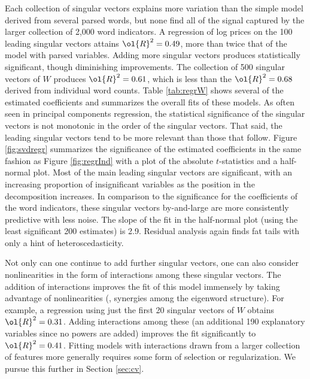 \documentclass[10pt]{article}
\begin{document}
Each collection of singular vectors explains more variation than the simple model derived from several parsed words, but none find all of the signal captured by the larger collection of 2,000 word indicators.  A regression of log prices on the 100 leading singular vectors attains $\ol{R}^2 = 0.49$, more than twice that of the model with parsed variables.  Adding more singular vectors produces statistically significant, though diminishing improvements.  The collection of 500 singular vectors of $W$ produces $\ol{R}^2 = 0.61$, which is less than the $\ol{R}^2 = 0.68$ derived from individual word counts.  Table \ref{tab:regrW}  shows several of the estimated coefficients and summarizes the overall fits of these models.  As often seen in principal components regression, the statistical significance of the singular vectors is not monotonic in the order of the singular vectors. That said, the leading singular vectors tend to be more relevant than those that follow. Figure \ref{fig:svdregr} summarizes the significance of the estimated coefficients in the same fashion as Figure \ref{fig:regrInd} with a plot of the absolute $t$-statistics and a half-normal plot. Most of the main leading singular vectors are significant, with an increasing proportion of insignificant variables as the position in the decomposition increases.  In comparison to the significance for the coefficients of the word indicators, these singular vectors by-and-large are more consistently predictive with less noise.  The slope of the fit in the half-normal plot (using the least significant 200 estimates) is 2.9.  Residual analysis again finds fat tails with only a hint of heteroscedasticity.
 
 
 Not only can one continue to add further singular vectors, one can also consider nonlinearities in the form of interactions among these singular vectors.  The addition of interactions improves the fit of this model immensely by taking advantage of nonlinearities (\ie, synergies among the eigenword structure).  For example, a regression using just the first 20 singular vectors of $W$ obtains $\ol{R}^2 = 0.31$.  Adding interactions among these (an additional 190 explanatory variables since no powers are added) improves the fit significantly to $\ol{R}^2 = 0.41$.  Fitting models with interactions drawn from a larger collection of features more generally requires some form of selection or regularization.  We pursue this further in Section \ref{sec:cv}.
 
\end{document}

